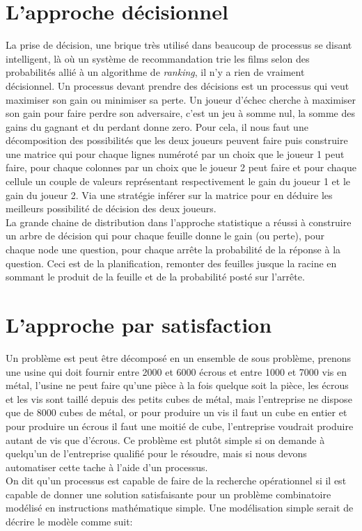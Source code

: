 \section{L'approche décisionnel}

La prise de décision, une brique très utilisé dans beaucoup de processus se disant intelligent, là où un système de recommandation trie les films selon des probabilités allié à un algorithme de \textit{ranking}, il n'y a rien de vraiment décisionnel. Un processus devant prendre des décisions est un processus qui veut maximiser son gain ou minimiser sa perte. Un joueur d'échec cherche à maximiser son gain pour faire perdre son adversaire, c'est un jeu à somme nul, la somme des gains du gagnant et du perdant donne zero. Pour cela, il nous faut une décomposition des possibilités que les deux joueurs peuvent faire puis construire une matrice qui pour chaque lignes numéroté par un choix que le joueur 1 peut faire, pour chaque colonnes par un choix que le joueur 2 peut faire et pour chaque cellule un couple de valeurs représentant respectivement le gain du joueur 1 et le gain du joueur 2. Via une stratégie inférer sur la matrice pour en déduire les meilleurs possibilité de décision des deux joueurs.\\
\linebreak
La grande chaine de distribution dans l'approche statistique a réussi à construire un arbre de décision qui pour chaque feuille donne le gain (ou perte), pour chaque node une question, pour chaque arrête la probabilité de la réponse à la question. Ceci est de la planification, remonter des feuilles jusque la racine en sommant le produit de la feuille et de la probabilité posté sur l'arrête.\\
\pagebreak

\section{L'approche par satisfaction}

Un problème est peut être décomposé en un ensemble de sous problème, prenons une usine qui doit fournir entre 2000 et 6000 écrous et entre 1000 et 7000 vis en métal, l'usine ne peut faire qu'une pièce à la fois quelque soit la pièce, les écrous et les vis sont taillé depuis des petits cubes de métal, mais l'entreprise ne dispose que de 8000 cubes de métal, or pour produire un vis il faut un cube en entier et pour produire un écrous il faut une moitié de cube, l'entreprise voudrait produire autant de vis que d'écrous. Ce problème est plutôt simple si on demande à quelqu'un de l'entreprise qualifié pour le résoudre, mais si nous devons automatiser cette tache à l'aide d'un processus.\\
\linebreak
On dit qu'un processus est capable de faire de la recherche opérationnel si il est capable de donner une solution satisfaisante pour un problème combinatoire modélisé en instructions mathématique simple. Une modélisation simple serait de décrire le modèle comme suit:

